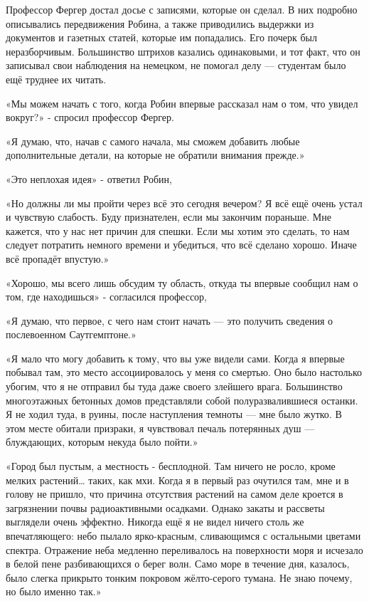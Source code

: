 \documentclass[a4paper,12pt]{book}
\begin{document}
\par
Профессор Фергер достал досье с записями, которые он сделал. В них подробно описывались передвижения Робина, а также приводились выдержки из документов и газетных статей, которые им попадались. Его почерк был неразборчивым. Большинство штрихов казались одинаковыми, и тот факт, что он записывал свои наблюдения на немецком, не помогал делу — студентам было ещё труднее их читать.
\par
«Мы можем начать с того, когда Робин впервые рассказал нам о том, что увидел вокруг?» - спросил профессор Фергер.
\par
«Я думаю, что, начав с самого начала, мы сможем добавить любые дополнительные детали, на которые не обратили внимания прежде.»
\par
«Это неплохая идея» - ответил Робин,
\par
«Но должны ли мы пройти через всё это сегодня вечером? Я всё ещё очень устал и чувствую слабость. Буду признателен, если мы закончим пораньше. Мне кажется, что у нас нет причин для спешки. Если мы хотим это сделать, то нам следует потратить немного времени и убедиться, что всё сделано хорошо. Иначе всё пропадёт впустую.»
\par
«Хорошо, мы всего лишь обсудим ту область, откуда ты впервые сообщил нам о том, где находишься» - согласился профессор,
\par
«Я думаю, что первое, с чего нам стоит начать — это получить сведения о послевоенном Саутгемптоне.»
\par
«Я мало что могу добавить к тому, что вы уже видели сами. Когда я впервые побывал там, это место ассоциировалось у меня со смертью. Оно было настолько убогим, что я не отправил бы туда даже своего злейшего врага. Большинство многоэтажных бетонных домов представляли собой полуразвалившиеся останки. Я не ходил туда, в руины, после наступления темноты — мне было жутко. В этом месте обитали призраки, я чувствовал печаль потерянных душ — блуждающих, которым некуда было пойти.»
\par
«Город был пустым, а местность - бесплодной. Там ничего не росло, кроме мелких растений… таких, как мхи. Когда я в первый раз очутился там, мне и в голову не пришло, что причина отсутствия растений на самом деле кроется в загрязнении почвы радиоактивными осадками. Однако закаты и рассветы выглядели очень эффектно. Никогда ещё я не видел ничего столь же впечатляющего: небо пылало ярко-красным, сливающимся с остальными цветами спектра. Отражение неба медленно переливалось на поверхности моря и исчезало в белой пене разбивающихся о берег волн. Само море в течение дня, казалось, было слегка прикрыто тонким покровом жёлто-серого тумана. Не знаю почему, но было именно так.»
\end{document}
